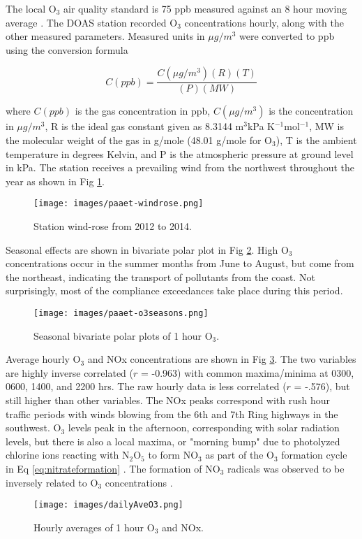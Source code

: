 \documentclass[preprint,12pt,authoryear]{elsarticle}
\begin{document}
	
\begin{linenumbers}

The local O$_{3}$ air quality standard is 75 ppb measured against an 8 hour moving average \citep{KEPA2017}. The DOAS station recorded O$_{3}$ concentrations hourly, along with the other measured parameters. Measured units in $\mu g/m^{3}$ were converted to ppb using the conversion formula

\begin{equation}
\label{eq:gasequation}
C(ppb) = \frac{C(\mu g/m^{3})(R) (T)}{(P) (MW)}
\end{equation}

where $C(ppb)$ is the gas concentration in ppb, $C(\mu g/m^{3})$ is the concentration in $\mu g/m^{3}$, R is the ideal gas constant given as 8.3144 m$^{3}$kPa K$^{-1}$mol$^{-1}$, MW is the molecular weight of the gas in g/mole (48.01 g/mole for O$_{3}$), T is the ambient temperature in degrees Kelvin, and P is the atmospheric pressure at ground level in kPa. The station receives a prevailing wind from the northwest throughout the year as shown in Fig \ref{fig:windrose}.
%
\begin{figure}[H]
\centering
\texttt{[image: images/paaet-windrose.png]}  %
\caption{Station wind-rose from 2012 to 2014.}
\label{fig:windrose}
\end{figure}
%
Seasonal effects are shown in bivariate polar plot in Fig \ref{fig:bipolarplots}. High O$_{3}$ concentrations occur in the summer months from June to August, but come from the northeast, indicating the transport of pollutants from the coast. Not surprisingly, most of the compliance exceedances take place during this period.
%
\begin{figure}[H]
\centering
\texttt{[image: images/paaet-o3seasons.png]}  %
\caption{Seasonal bivariate polar plots of 1 hour O$_3$.}
\label{fig:bipolarplots}
\end{figure}
%
Average hourly O$_{3}$ and NOx concentrations are shown in Fig \ref{fig:hourlyAveO3}. The two variables are highly inverse correlated ($r$ = -0.963) with common maxima/minima at 0300, 0600, 1400, and 2200 hrs. The raw hourly data is less correlated ($r$ = -.576), but still higher than other variables. The NOx peaks correspond with rush hour traffic periods with winds blowing from the 6th and 7th Ring highways in the southwest. O$_{3}$ levels peak in the afternoon, corresponding with solar radiation levels, but there is also a local maxima, or "morning bump" due to photolyzed chlorine ions reacting with N$_{2}$O$_{5}$ to form NO$_{3}$ as part of the O$_{3}$ formation cycle in Eq \ref{eq:nitrateformation} \citep{Calvert2015}. The formation of NO$_{3}$ radicals was observed to be inversely related to O$_{3}$ concentrations \citep{Song2011}.
%
\begin{figure}[H]
\centering
\texttt{[image: images/dailyAveO3.png]}  %
\caption{Hourly averages of 1 hour O$_{3}$ and NOx.}
\label{fig:hourlyAveO3}
\end{figure}
%

\end{linenumbers}
\end{document}
